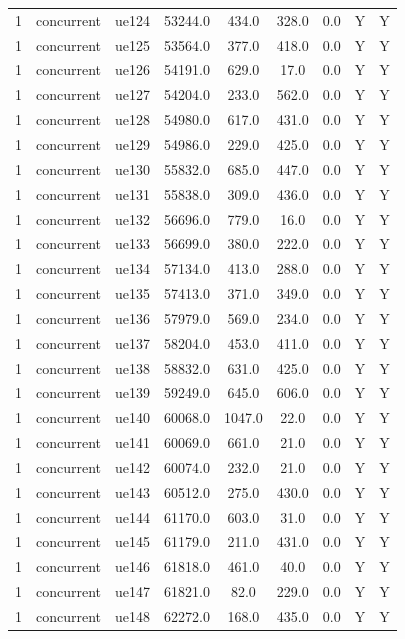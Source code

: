\begin{table}[ht]
\begin{tabular}{|c|c|c|c|c|c|c|c|c|}
1 & concurrent & ue124 & 53244.0 & 434.0 & 328.0 & 0.0 & Y & Y \\
1 & concurrent & ue125 & 53564.0 & 377.0 & 418.0 & 0.0 & Y & Y \\
1 & concurrent & ue126 & 54191.0 & 629.0 & 17.0 & 0.0 & Y & Y \\
1 & concurrent & ue127 & 54204.0 & 233.0 & 562.0 & 0.0 & Y & Y \\
1 & concurrent & ue128 & 54980.0 & 617.0 & 431.0 & 0.0 & Y & Y \\
1 & concurrent & ue129 & 54986.0 & 229.0 & 425.0 & 0.0 & Y & Y \\
1 & concurrent & ue130 & 55832.0 & 685.0 & 447.0 & 0.0 & Y & Y \\
1 & concurrent & ue131 & 55838.0 & 309.0 & 436.0 & 0.0 & Y & Y \\
1 & concurrent & ue132 & 56696.0 & 779.0 & 16.0 & 0.0 & Y & Y \\
1 & concurrent & ue133 & 56699.0 & 380.0 & 222.0 & 0.0 & Y & Y \\
1 & concurrent & ue134 & 57134.0 & 413.0 & 288.0 & 0.0 & Y & Y \\
1 & concurrent & ue135 & 57413.0 & 371.0 & 349.0 & 0.0 & Y & Y \\
1 & concurrent & ue136 & 57979.0 & 569.0 & 234.0 & 0.0 & Y & Y \\
1 & concurrent & ue137 & 58204.0 & 453.0 & 411.0 & 0.0 & Y & Y \\
1 & concurrent & ue138 & 58832.0 & 631.0 & 425.0 & 0.0 & Y & Y \\
1 & concurrent & ue139 & 59249.0 & 645.0 & 606.0 & 0.0 & Y & Y \\
1 & concurrent & ue140 & 60068.0 & 1047.0 & 22.0 & 0.0 & Y & Y \\
1 & concurrent & ue141 & 60069.0 & 661.0 & 21.0 & 0.0 & Y & Y \\
1 & concurrent & ue142 & 60074.0 & 232.0 & 21.0 & 0.0 & Y & Y \\
1 & concurrent & ue143 & 60512.0 & 275.0 & 430.0 & 0.0 & Y & Y \\
1 & concurrent & ue144 & 61170.0 & 603.0 & 31.0 & 0.0 & Y & Y \\
1 & concurrent & ue145 & 61179.0 & 211.0 & 431.0 & 0.0 & Y & Y \\
1 & concurrent & ue146 & 61818.0 & 461.0 & 40.0 & 0.0 & Y & Y \\
1 & concurrent & ue147 & 61821.0 & 82.0 & 229.0 & 0.0 & Y & Y \\
1 & concurrent & ue148 & 62272.0 & 168.0 & 435.0 & 0.0 & Y & Y \\

\end{tabular}
\end{table}
